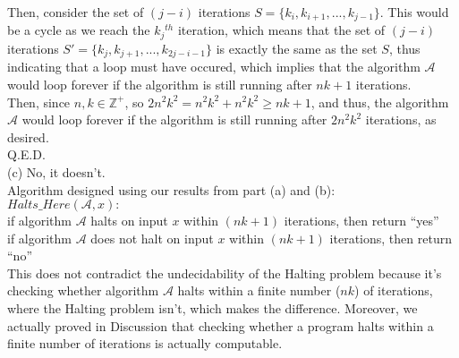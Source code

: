 \documentclass{article}
\begin{document}
Then, consider the set of $(j-i)$ iterations $S = \{k_i, k_{i+1}, ..., k_{j-1}\}$. This would be a cycle as we reach the $k_j$$^{th}$ iteration, which means that the set of $(j-i)$ iterations $S' = \{k_j, k_{j+1}, ..., k_{2j-i-1}\}$ is exactly the same as the set $S$, thus indicating that a loop must have occured, which implies that the algorithm $\mathscr{A}$ would loop forever if the algorithm is still running after $nk + 1$ iterations. \\[.2cm]
\indent Then, since $n,k\in\mathbb{Z^+}$, so $2n^2k^2 = n^2k^2 + n^2k^2 \geq nk + 1$, and thus, the algorithm $\mathscr{A}$ would loop forever if the algorithm is still running after $2n^2k^2$ iterations, as desired. \\[.2cm]
\indent Q.E.D. \\[.5cm]
{\color{red} (c) No, it doesn't.} \\[.3cm]
\indent Algorithm designed using our results from part (a) and (b): \\ [.2cm]
\indent $ Halts\_Here(\mathscr{A}, x): $ \\
\indent\indent if algorithm $\mathscr{A}$ halts on input $x$ within $(nk+1)$ iterations, then return ``yes'' \\
\indent\indent if algorithm $\mathscr{A}$ does not halt on input $x$ within $(nk+1)$ iterations, then return ``no'' \\

This does not contradict the undecidability of the Halting problem because it's checking whether algorithm $\mathscr{A}$ halts within a finite number ($nk$) of iterations, where the Halting problem isn't, which makes the difference. Moreover, we actually proved in Discussion that checking whether a program halts within a finite number of iterations is actually computable.
\end{document}
